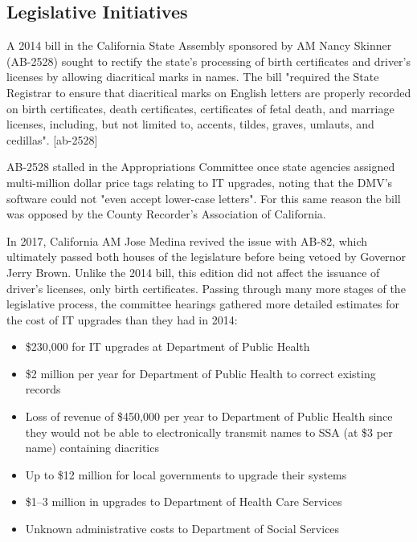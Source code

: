 \subsection{Legislative Initiatives}

A 2014 bill in the California State Assembly sponsored by AM Nancy Skinner
(AB-2528) sought to rectify the state's processing of birth certificates and
driver's licenses by allowing diacritical marks in names. The bill "required
the State Registrar to ensure that diacritical marks on English letters are
properly recorded on birth certificates, death certificates, certificates of
fetal death, and marriage licenses, including, but not limited to, accents,
tildes, graves, umlauts, and cedillas". [ab-2528]

AB-2528 stalled in the Appropriations Committee once state agencies assigned
multi-million dollar price tags relating to IT upgrades, noting that the DMV's
software could not "even accept lower-case letters". For this same reason the
bill was opposed by the County Recorder's Association of California.

In 2017, California AM Jose Medina revived the issue with AB-82, which
ultimately passed both houses of the legislature before being vetoed by
Governor Jerry Brown. Unlike the 2014 bill, this edition did not affect the
issuance of driver's licenses, only birth certificates. Passing through many
more stages of the legislative process, the committee hearings gathered more
detailed estimates for the cost of IT upgrades than they had in 2014:

\begin{itemize}

\item \$230,000 for IT upgrades at Department of Public Health
\item \$2 million per year for Department of Public Health to correct existing
records
\item Loss of revenue of \$450,000 per year to Department of Public Health since
they would not be able to electronically transmit names to SSA (at \$3 per name)
containing diacritics
\item Up to \$12 million for local governments to upgrade their systems
\item \$1--3 million in upgrades to Department of Health Care Services
\item Unknown administrative costs to Department of Social Services

\end{itemize}

